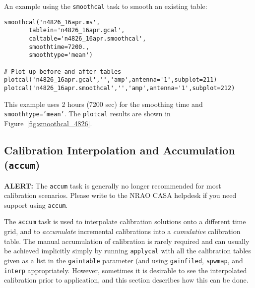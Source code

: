 An example using the {\tt smoothcal} task to smooth an existing table:
\small
\begin{verbatim}
smoothcal('n4826_16apr.ms',
       tablein='n4826_16apr.gcal',
       caltable='n4826_16apr.smoothcal',
       smoothtime=7200.,
       smoothtype='mean')

# Plot up before and after tables
plotcal('n4826_16apr.gcal','','amp',antenna='1',subplot=211)
plotcal('n4826_16apr.smoothcal','','amp',antenna='1',subplot=212)
\end{verbatim}
\normalsize
This example uses 2 hours (7200 sec) for the smoothing time and
{\tt smoothtype='mean'}.  The {\tt plotcal} results are shown
in Figure~\ref{fig:smoothcal_4826}.


\subsection{Calibration Interpolation and Accumulation ({\tt accum})}
\label{section:cal.tables.accum}

{\bf ALERT:} The {\tt accum} task is generally no longer recommended
for most calibration scenarios.  Please write to the NRAO CASA
helpdesk  if you need support using {\tt accum}.

The {\tt accum} task is used to interpolate calibration solutions onto
a different time grid, and to {\it accumulate} incremental
calibrations into a {\it cumulative} calibration table.  The manual
accumulation of calibration is rarely required and can usually be
achieved implicitly simply by running {\tt applycal} with all the
calibration tables given as a list in the {\tt gaintable} parameter
(and using {\tt gainfiled}, {\tt spwmap}, and {\tt interp}
appropriately.  However, sometimes it is desirable to see the
interpolated calibration prior to application, and this section
describes how this can be done.


